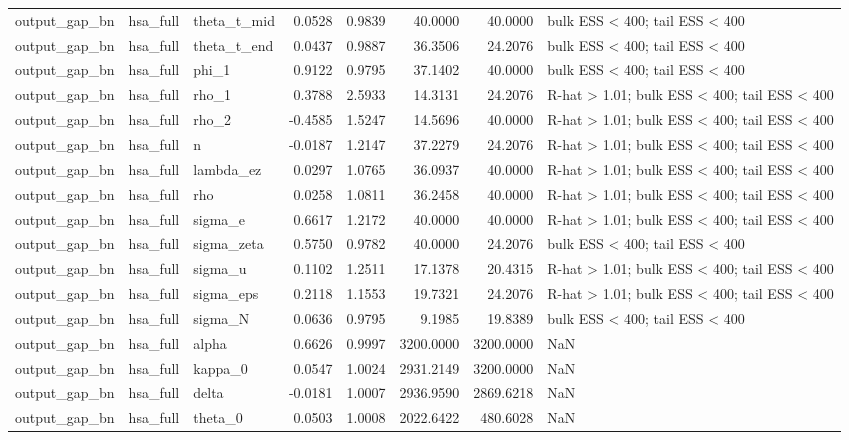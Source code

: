 \begin{tabular}{lllrrrrl}
output\_gap\_bn & hsa\_full & theta\_t\_mid & 0.0528 & 0.9839 & 40.0000 & 40.0000 & bulk ESS < 400; tail ESS < 400 \\
output\_gap\_bn & hsa\_full & theta\_t\_end & 0.0437 & 0.9887 & 36.3506 & 24.2076 & bulk ESS < 400; tail ESS < 400 \\
output\_gap\_bn & hsa\_full & phi\_1 & 0.9122 & 0.9795 & 37.1402 & 40.0000 & bulk ESS < 400; tail ESS < 400 \\
output\_gap\_bn & hsa\_full & rho\_1 & 0.3788 & 2.5933 & 14.3131 & 24.2076 & R-hat > 1.01; bulk ESS < 400; tail ESS < 400 \\
output\_gap\_bn & hsa\_full & rho\_2 & -0.4585 & 1.5247 & 14.5696 & 40.0000 & R-hat > 1.01; bulk ESS < 400; tail ESS < 400 \\
output\_gap\_bn & hsa\_full & n & -0.0187 & 1.2147 & 37.2279 & 24.2076 & R-hat > 1.01; bulk ESS < 400; tail ESS < 400 \\
output\_gap\_bn & hsa\_full & lambda\_ez & 0.0297 & 1.0765 & 36.0937 & 40.0000 & R-hat > 1.01; bulk ESS < 400; tail ESS < 400 \\
output\_gap\_bn & hsa\_full & rho & 0.0258 & 1.0811 & 36.2458 & 40.0000 & R-hat > 1.01; bulk ESS < 400; tail ESS < 400 \\
output\_gap\_bn & hsa\_full & sigma\_e & 0.6617 & 1.2172 & 40.0000 & 40.0000 & R-hat > 1.01; bulk ESS < 400; tail ESS < 400 \\
output\_gap\_bn & hsa\_full & sigma\_zeta & 0.5750 & 0.9782 & 40.0000 & 24.2076 & bulk ESS < 400; tail ESS < 400 \\
output\_gap\_bn & hsa\_full & sigma\_u & 0.1102 & 1.2511 & 17.1378 & 20.4315 & R-hat > 1.01; bulk ESS < 400; tail ESS < 400 \\
output\_gap\_bn & hsa\_full & sigma\_eps & 0.2118 & 1.1553 & 19.7321 & 24.2076 & R-hat > 1.01; bulk ESS < 400; tail ESS < 400 \\
output\_gap\_bn & hsa\_full & sigma\_N & 0.0636 & 0.9795 & 9.1985 & 19.8389 & bulk ESS < 400; tail ESS < 400 \\
output\_gap\_bn & hsa\_full & alpha & 0.6626 & 0.9997 & 3200.0000 & 3200.0000 & NaN \\
output\_gap\_bn & hsa\_full & kappa\_0 & 0.0547 & 1.0024 & 2931.2149 & 3200.0000 & NaN \\
output\_gap\_bn & hsa\_full & delta & -0.0181 & 1.0007 & 2936.9590 & 2869.6218 & NaN \\
output\_gap\_bn & hsa\_full & theta\_0 & 0.0503 & 1.0008 & 2022.6422 & 480.6028 & NaN \\

\end{tabular}
